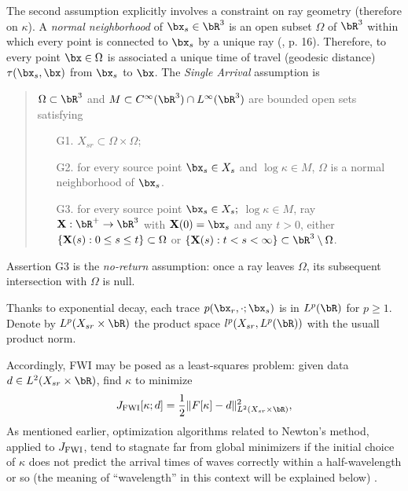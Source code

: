 The second assumption explicitly involves a constraint on ray geometry
(therefore on $\kappa$). A {\em normal neighborhood} of
$\bx_s \in \bR^3$ is an open subset $\Omega$ of $\bR^3$ 
within which every point is connected to $\bx_s$ by  a unique ray  (\cite{Friedlander:75},
p. 16). Therefore, to every point $\bx \in \Omega$ is associated a
unique time of travel (geodesic distance) $\tau(\bx_s,\bx)$ from $\bx_s$ to $\bx$.
The {\em Single Arrival} assumption is
\begin{quote}
  $\Omega\subset \bR^3$ 
and $M \subset C^{\infty}(\bR^3) \cap L^{\infty}(\bR^3)$ are bounded open sets satisfying 
\begin{itemize}
  \item[G1. ] $X_{sr} \subset \Omega \times \Omega$;
  \item[G2. ] for every source point $\bx_s\in X_{s}$ and $\log \kappa \in M$, $\Omega$ is a
    normal neighborhood of $\bx_s$.
  \item[G3. ] for every source point $\bx_s \in X_{s};$
    $\log \kappa \in M$, ray ${\bf X}:\bR^+\rightarrow \bR^3$
    with ${\bf X}(0)=\bx_s$ and any $t>0$, either $\{{\bf X}(s): 0\le s \le t\} \subset \Omega$
    or $\{{\bf X}(s): t < s < \infty\} \subset \bR^3 \setminus \Omega$.
  \end{itemize}
\end{quote}
Assertion G3 is the {\em no-return} assumption: once a ray leaves
$\Omega$, its subsequent intersection with $\Omega$ is null.

Thanks to exponential decay, each trace $p(\bx_r,\cdot;\bx_s)$ is in $L^{p}(\bR)$ for $p
\ge 1$.
Denote by $L^p(X_{sr} \times \bR)$ the product space $l^p(X_{sr},L^p(\bR))$
with the usuall product norm. 

Accordingly, FWI may be posed as a least-squares
problem: given data $d \in
L^2(X_{sr}\times \bR)$, find $\kappa$ to minimize
\begin{equation}
  \label{eqn:fwi}
  J_{\rm FWI}[\kappa;d]= \frac{1}{2}\|F[\kappa]-d\|^2_{L^2(X_{sr} \times \bR)},
\end{equation}
As mentioned earlier, optimization algorithms related to Newton's method, applied to
$J_{\rm FWI}$, tend to stagnate far from global minimizers if
the initial choice of $\kappa$ does not predict the arrival times of
waves correctly within a half-wavelength or so (the meaning of
``wavelength'' in this context will be explained below)
\cite[]{GauTarVir:86,VirieuxOperto:09}.

